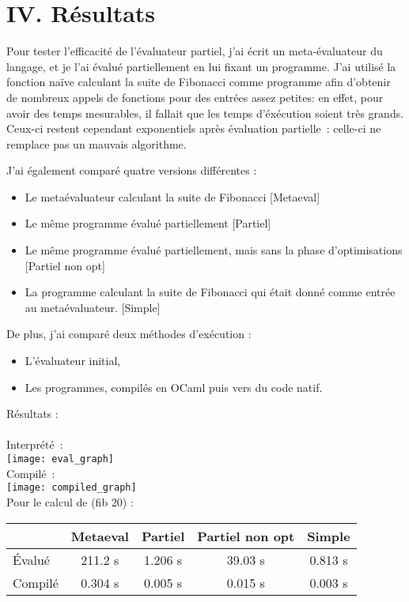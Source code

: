 \documentclass[a4paper,11pt]{article}
\newcommand{\code}[1]{{\fontfamily{pcr}\selectfont #1}}
\begin{document}
\section{IV. Résultats}

Pour tester l'efficacité de l'évaluateur partiel, j'ai écrit un
meta-évaluateur du langage, et je l'ai évalué partiellement en lui
fixant un programme. J'ai utilisé la fonction naïve calculant la suite
de Fibonacci comme programme afin d'obtenir de nombreux appels de
fonctions pour des entrées assez petites: en effet, pour avoir des
temps mesurables, il fallait que les temps d'éxécution soient très
grands. Ceux-ci restent cependant exponentiels après évaluation
partielle~: celle-ci ne remplace pas un mauvais algorithme.

J'ai également comparé quatre versions différentes :

\begin{itemize}

\item Le metaévaluateur calculant la suite de Fibonacci [Metaeval]
\item Le même programme évalué partiellement [Partiel]
\item Le même programme évalué partiellement, mais sans la phase
d'optimisations [Partiel non opt]
\item La programme calculant la suite de Fibonacci qui était donné comme
entrée au metaévaluateur. [Simple]

\end{itemize}

De plus, j'ai comparé deux méthodes d'exécution :

\begin{itemize}
\item L'évaluateur initial,
\item Les programmes, compilés en OCaml puis vers du code natif.
\end{itemize}

\newpage
\noindent Résultats : \\ \\
Interprété~: \\
\texttt{[image: eval\_graph]} \\
Compilé~: \\
\texttt{[image: compiled\_graph]}
 \\

Pour le calcul de \code{(fib 20)} : \\

\begin{tabular}{ | l | c | c | c | c | } \hline
       	& Metaeval & Partiel & Partiel non opt & Simple \\ \hline
Évalué 	& 211.2 s  & 1.206 s & 39.03 s         & 0.813 s \\ \hline
Compilé & 0.304 s  & 0.005 s & 0.015 s         & 0.003 s \\ \hline

\end{tabular}
\\
\end{document}
